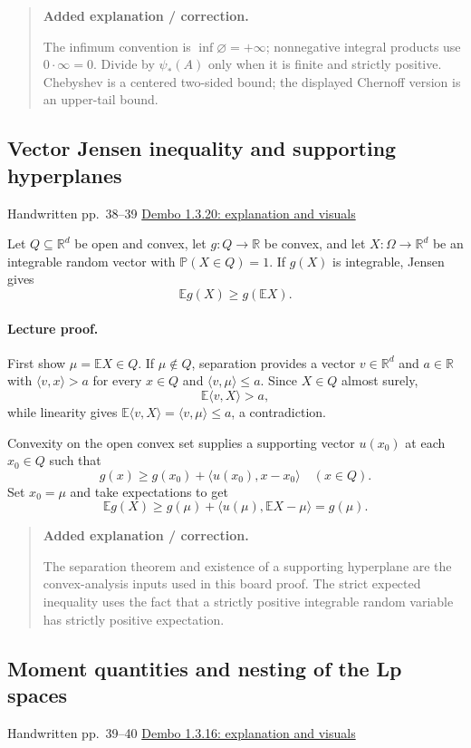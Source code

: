 \documentclass[11pt,letterpaper]{article}
\newcommand{\lecturesection}[1]{\subsection{#1}}
\begin{document}
\begin{quote}\small\textbf{Added explanation / correction.}

The infimum convention is $\inf\varnothing=+\infty$; nonnegative integral products use $0\cdot\infty=0$. Divide by $\psi_*(A)$ only when it is finite and strictly positive. Chebyshev is a centered two-sided bound; the displayed Chernoff version is an upper-tail bound.
\end{quote}

\hypertarget{l5-s3}{}
\lecturesection{Vector Jensen inequality and supporting hyperplanes}
{\small\textcolor{lectureink}{Handwritten pp.\ 38--39} \quad \href{https://josephrbailey.com/probability/\#entry-1-3-20}{Dembo 1.3.20: explanation and visuals}}

Let $Q\subseteq\mathbb R^d$ be open and convex, let $g:Q\to\mathbb R$ be convex, and let $X:\Omega\to\mathbb R^d$ be an integrable random vector with $\mathbb P(X\in Q)=1$. If $g(X)$ is integrable, Jensen gives \[\mathbb E g(X)\ge g(\mathbb E X).\]

\paragraph{Lecture proof.}
First show $\mu=\mathbb E X\in Q$. If $\mu\notin Q$, separation provides a vector $v\in\mathbb R^d$ and $a\in\mathbb R$ with $\langle v,x\rangle>a$ for every $x\in Q$ and $\langle v,\mu\rangle\le a$. Since $X\in Q$ almost surely, \[\mathbb E\langle v,X\rangle>a,\] while linearity gives $\mathbb E\langle v,X\rangle=\langle v,\mu\rangle\le a$, a contradiction.

Convexity on the open convex set supplies a supporting vector $u(x_0)$ at each $x_0\in Q$ such that \[g(x)\ge g(x_0)+\langle u(x_0),x-x_0\rangle\quad(x\in Q).\] Set $x_0=\mu$ and take expectations to get \[\mathbb E g(X)\ge g(\mu)+\langle u(\mu),\mathbb E X-\mu\rangle=g(\mu).\]

\begin{quote}\small\textbf{Added explanation / correction.}

The separation theorem and existence of a supporting hyperplane are the convex-analysis inputs used in this board proof. The strict expected inequality uses the fact that a strictly positive integrable random variable has strictly positive expectation.
\end{quote}

\hypertarget{l5-s4}{}
\lecturesection{Moment quantities and nesting of the Lp spaces}
{\small\textcolor{lectureink}{Handwritten pp.\ 39--40} \quad \href{https://josephrbailey.com/probability/\#entry-1-3-16}{Dembo 1.3.16: explanation and visuals}}
\end{document}
